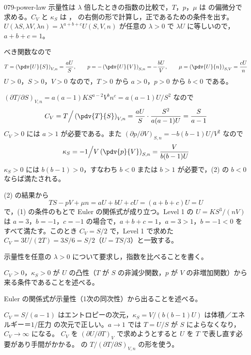 \documentclass[uplatex,dvipdfmx,a4paper,11pt]{jsarticle}
\begin{document}
\begin{kaisetsu}{079-power-law}
\houshin 示量性は $\lambda$ 倍したときの指数の比較で，$T$，$p$，$\mu$ は  の偏微分で求める。$C_{V}$ と $\kappa_{S}$ は ， の右側の形で計算し，正であるための条件を出す。
\keisan {} $U(\lambda S,\lambda V,\lambda n) = \lambda^{a+b+c}U(S,V,n)$ が任意の $\lambda > 0$ で $\lambda U$ に等しいので，$a + b + c = 1$。

 べき関数なので
\[ T = \left(\pdv{U}{S}\right)_{V,n} = \frac{aU}{S}, \qquad p = -\left(\pdv{U}{V}\right)_{S,n} = -\frac{bU}{V}, \qquad \mu = \left(\pdv{U}{n}\right)_{S,V} = \frac{cU}{n} \]
$U > 0$，$S > 0$，$V > 0$ なので，$T > 0$ から $a > 0$，$p > 0$ から $b < 0$ である。

 $(\partial T/\partial S)_{V,n} = a(a-1)KS^{a-2}V^{b}n^{c} = a(a-1)U/S^{2}$ なので
\[ C_{V} = T\Big/\left(\pdv{T}{S}\right)_{V,n} = \frac{aU}{S}\cdot\frac{S^{2}}{a(a-1)U} = \frac{S}{a-1} \]
$C_{V} > 0$ には $a > 1$ が必要である。また $(\partial p/\partial V)_{S,n} = -b(b-1)U/V^{2}$ なので
\[ \kappa_{S} = -1\Big/V\left(\pdv{p}{V}\right)_{S,n} = \frac{V}{b(b-1)U} \]
$\kappa_{S} > 0$ には $b(b-1) > 0$，すなわち $b < 0$ または $b > 1$ が必要で，(2) の $b < 0$ ならば満たされる。

 (2) の結果から
\[ TS - pV + \mu n = aU + bU + cU = (a + b + c)U = U \]
で，(1) の条件のもとで Euler の関係式が成り立つ。Level 1 の $U = KS^{3}/(nV)$ は $a = 3$，$b = -1$，$c = -1$ の場合で，$a + b + c = 1$，$a = 3 > 1$，$b = -1 < 0$ をすべて満たす。このとき $C_{V} = S/2$ で，Level 1 で求めた $C_{V} = 3U/(2T) = 3S/6 = S/2$（$U = TS/3$）と一致する。
\begin{ronten}
  \item {} 示量性を任意の $\lambda > 0$ について要求し，指数を比べることを書く。
  \item {} $C_{V} > 0$，$\kappa_{S} > 0$ が $U$ の凸性（$T$ が $S$ の非減少関数，$p$ が $V$ の非増加関数）から来る条件であることを述べる。
  \item {} Euler の関係式が示量性（1次の同次性）から出ることを述べる。
\end{ronten}
\kenzan $C_{V} = S/(a-1)$ はエントロピーの次元，$\kappa_{S} = V/(b(b-1)U)$ は体積／エネルギー＝$1/$圧力 の次元で正しい。$a \to 1$ では $T = U/S$ が $S$ によらなくなり，$C_{V} \to \infty$ になる。
\tsumazuki $C_{V}$ を $(\partial U/\partial T)_{V}$ で求めようとすると $U$ を $T$ で表し直す必要があり手間がかかる。 の $T/(\partial T/\partial S)_{V,n}$ の形を使う。
\end{kaisetsu}
\end{document}
